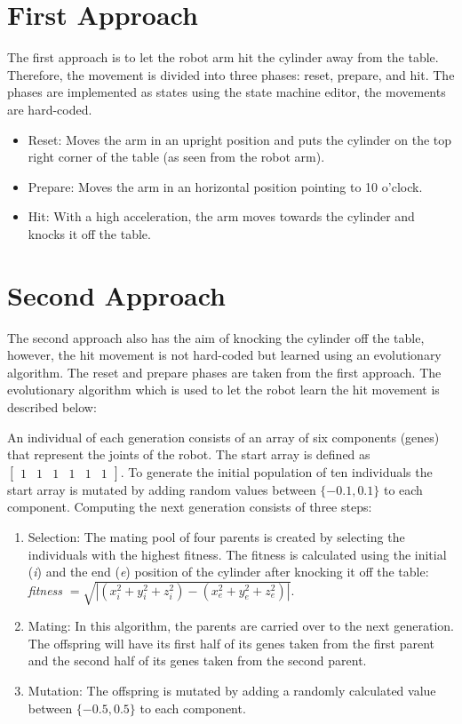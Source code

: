 \documentclass[10pt,twocolumn,letterpaper]{article}
\begin{document}
\section{First Approach} \label{sec:firstApproach}

The first approach is to let the robot arm hit the cylinder away from the table. Therefore, the movement is divided into three phases: reset, prepare, and hit. The phases are implemented as states using the state machine editor, the movements are hard-coded.

\begin{itemize}
\item Reset: Moves the arm in an upright position and puts the cylinder on the top right corner of the table (as seen from the robot arm).
\item Prepare: Moves the arm in an horizontal position pointing to 10 o'clock.
\item Hit: With a high acceleration, the arm moves towards the cylinder and knocks it off the table.
\end{itemize}

\section{Second Approach} \label{sec:secondApproach}

The second approach also has the aim of knocking the cylinder off the table, however, the hit movement is not hard-coded but learned using an evolutionary algorithm. The reset and prepare phases are taken from the first approach.
The evolutionary algorithm which is used to let the robot learn the hit movement is described below:

An individual of each generation consists of an array of six components (genes) that represent the joints of the robot. The start array is defined as $\begin{bmatrix}
				1 & 1 & 1 & 1 & 1 & 1
				\end{bmatrix}$.
To generate the initial population of ten individuals the start array is mutated by adding random values between $\{-0.1,0.1\}$ to each component.
Computing the next generation consists of three steps:
\begin{enumerate}
\item Selection: The mating pool of four parents is created by selecting the individuals with the highest fitness. The fitness is calculated using the initial (\textit{i}) and the end (\textit{e}) position of the cylinder after knocking it off the table: \textit{fitness} $= \sqrt{|(x_i^2+y_i^2+z_i^2)-(x_e^2+y_e^2+z_e^2)|}$.

\item Mating: In this algorithm, the parents are carried over to the next generation. The offspring will have its first half of its genes taken from the first parent and the second half of its genes taken from the second parent. 

\item Mutation: The offspring is mutated by adding a randomly calculated value between $\{-0.5,0.5\}$ to each component.
\end{enumerate}
\end{document}
